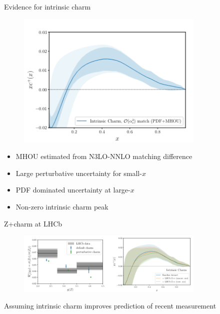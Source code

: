 \documentclass[aspectratio=43, 8pt,t]{beamer}
\begin{document}
\begin{frame}{Evidence for intrinsic charm}
  \begin{figure}
    \includegraphics[width=0.8\textwidth]{discovery_of_ic.png}
  \end{figure}
  \begin{itemize}
    \item MHOU estimated from N3LO-NNLO matching difference
    \item Large perturbative uncertainty for small-$x$
    \item PDF dominated uncertainty at large-$x$
    \item Non-zero intrinsic charm peak
  \end{itemize}
\end{frame}

\begin{frame}{Z+charm at LHCb}
  \begin{figure}
    \includegraphics[width=0.8\textwidth]{zc_lhcb.png}
  \end{figure}
  Assuming intrinsic charm improves prediction of recent measurement
\end{frame}
\end{document}
